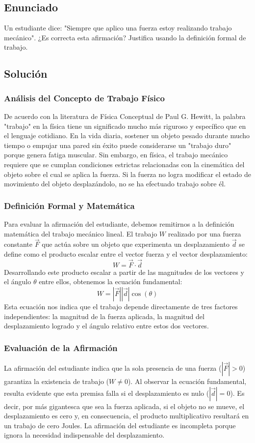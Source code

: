 \documentclass[a4paper,12pt]{article}
\begin{document}
\subsection*{Enunciado}
Un estudiante dice: "Siempre que aplico una fuerza estoy realizando trabajo mecánico". 
¿Es correcta esta afirmación? Justifica usando la definición formal de trabajo.

\subsection*{Solución}

\subsubsection*{Análisis del Concepto de Trabajo Físico}
De acuerdo con la literatura de Física Conceptual de Paul G. Hewitt, la palabra "trabajo" en la física tiene un significado mucho más riguroso y específico que en el lenguaje cotidiano. En la vida diaria, sostener un objeto pesado durante mucho tiempo o empujar una pared sin éxito puede considerarse un "trabajo duro" porque genera fatiga muscular. Sin embargo, en física, el trabajo mecánico requiere que se cumplan condiciones estrictas relacionadas con la cinemática del objeto sobre el cual se aplica la fuerza. Si la fuerza no logra modificar el estado de movimiento del objeto desplazándolo, no se ha efectuado trabajo sobre él.

\subsubsection*{Definición Formal y Matemática}
Para evaluar la afirmación del estudiante, debemos remitirnos a la definición matemática del trabajo mecánico lineal. El trabajo $W$ realizado por una fuerza constante $\vec{F}$ que actúa sobre un objeto que experimenta un desplazamiento $\vec{d}$ se define como el producto escalar entre el vector fuerza y el vector desplazamiento:
$$W = \vec{F} \cdot \vec{d}$$
Desarrollando este producto escalar a partir de las magnitudes de los vectores y el ángulo $\theta$ entre ellos, obtenemos la ecuación fundamental:
$$W = |\vec{F}| |\vec{d}| \cos(\theta)$$
Esta ecuación nos indica que el trabajo depende directamente de tres factores independientes: la magnitud de la fuerza aplicada, la magnitud del desplazamiento logrado y el ángulo relativo entre estos dos vectores.

\subsubsection*{Evaluación de la Afirmación}
La afirmación del estudiante indica que la sola presencia de una fuerza ($|\vec{F}| > 0$) garantiza la existencia de trabajo ($W \neq 0$). Al observar la ecuación fundamental, resulta evidente que esta premisa falla si el desplazamiento es nulo ($|\vec{d}| = 0$). Es decir, por más gigantesca que sea la fuerza aplicada, si el objeto no se mueve, el desplazamiento es cero y, en consecuencia, el producto multiplicativo resultará en un trabajo de cero Joules. La afirmación del estudiante es incompleta porque ignora la necesidad indispensable del desplazamiento.
\end{document}
